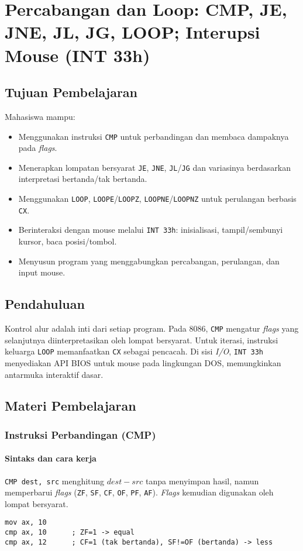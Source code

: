 \chapter{Percabangan dan Loop: CMP, JE, JNE, JL, JG, LOOP; Interupsi Mouse (INT 33h)}

\section{Tujuan Pembelajaran}
Mahasiswa mampu:
\begin{itemize}
  \item Menggunakan instruksi \texttt{CMP} untuk perbandingan dan membaca dampaknya pada \textit{flags}.
  \item Menerapkan lompatan bersyarat \texttt{JE}, \texttt{JNE}, \texttt{JL}/\texttt{JG} dan variasinya berdasarkan interpretasi bertanda/tak bertanda.
  \item Menggunakan \texttt{LOOP}, \texttt{LOOPE}/\texttt{LOOPZ}, \texttt{LOOPNE}/\texttt{LOOPNZ} untuk perulangan berbasis \texttt{CX}.
  \item Berinteraksi dengan mouse melalui \texttt{INT 33h}: inisialisasi, tampil/sembunyi kursor, baca posisi/tombol.
  \item Menyusun program yang menggabungkan percabangan, perulangan, dan input mouse.
\end{itemize}

\section{Pendahuluan}
Kontrol alur adalah inti dari setiap program. Pada 8086, \texttt{CMP} mengatur \textit{flags} yang selanjutnya diinterpretasikan oleh lompat bersyarat. Untuk iterasi, instruksi keluarga \texttt{LOOP} memanfaatkan \texttt{CX} sebagai pencacah. Di sisi \textit{I/O}, \texttt{INT 33h} menyediakan API BIOS untuk mouse pada lingkungan DOS, memungkinkan antarmuka interaktif dasar.

\section{Materi Pembelajaran}
\subsection{Instruksi Perbandingan (CMP)}
\subsubsection{Sintaks dan cara kerja}
\texttt{CMP dest, src} menghitung \(dest - src\) tanpa menyimpan hasil, namun memperbarui \textit{flags} (\texttt{ZF}, \texttt{SF}, \texttt{CF}, \texttt{OF}, \texttt{PF}, \texttt{AF}). \textit{Flags} kemudian digunakan oleh lompat bersyarat.
\begin{verbatim}
mov ax, 10
cmp ax, 10      ; ZF=1 -> equal
cmp ax, 12      ; CF=1 (tak bertanda), SF!=OF (bertanda) -> less
\end{verbatim}

